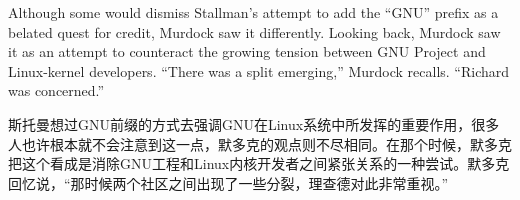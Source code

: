 




\ifdefined\eng
Although some would dismiss Stallman's attempt to add the ``GNU'' prefix as a belated quest for credit, Murdock saw it differently. Looking back, Murdock saw it as an attempt to counteract the growing tension between GNU Project and Linux-kernel developers. ``There was a split emerging,'' Murdock recalls. ``Richard was concerned.''
\fi

\ifdefined\chs
斯托曼想过GNU前缀的方式去强调GNU在Linux系统中所发挥的重要作用，很多人也许根本就不会注意到这一点，默多克的观点则不尽相同。在那个时候，默多克把这个看成是消除GNU工程和Linux内核开发者之间紧张关系的一种尝试。默多克回忆说，``那时候两个社区之间出现了一些分裂，理查德对此非常重视。''
\fi


